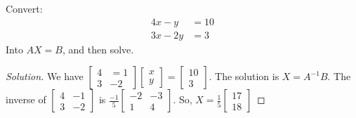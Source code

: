 \documentclass[../main.tex]{subfiles}
\begin{document}
\begin{problem}
Convert:
\begin{align}
\nonumber 4x - y &= 10\\
\nonumber 3x - 2y &= 3
\end{align}
Into $AX = B$, and then solve.
\end{problem}
\begin{proof}[Solution]
We have $\begin{bmatrix} 4 & =1 \\ 3 & -2 \end{bmatrix} \begin{bmatrix} x \\ y \end{bmatrix} = \begin{bmatrix} 10 \\ 3 \end{bmatrix}$. The solution is $X = A^{-1}B$. The inverse of $\begin{bmatrix} 4 & -1 \\ 3 & -2 \end{bmatrix}$ is $\frac{-1}{5}\begin{bmatrix} -2 & -3 \\ 1 & 4\end{bmatrix}$. So, $X = \frac{1}{5} \begin{bmatrix} 17 \\ 18 \end{bmatrix}$
\end{proof}
\end{document}
